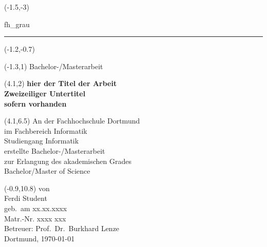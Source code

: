 \documentclass[12pt,twoside]{report}   %
\begin{document}
\begin{titlepage}
  \begin{textblock}{6.5}(-1.5,-3)
    \begin{color}{fh_grau}
      \rule{6.8cm}{33cm}    
    \end{color}
  \end{textblock}
  \begin{textblock}{6.5}(-1.2,-0.7)
  \end{textblock}
  \begin{textblock}{6.5}(-1.3,1)
    {\large \textsf{Bachelor-/Masterarbeit}}            
  \end{textblock}

  \begin{textblock}{7}(4.1,2)
    {\noindent \huge 
      \textsf{\textbf{hier der Titel der Arbeit\\[0.3cm] 
          \Large  Zweizeiliger Untertitel\\[0.05cm]
          sofern vorhanden}} }
  \end{textblock}


  \begin{textblock}{6}(4.1,6.5)\noindent
    \textsf{An der Fachhochschule Dortmund\\
    im Fachbereich Informatik\\
    Studiengang Informatik \\
    erstellte Bachelor-/Masterarbeit \\
    zur Erlangung des akademischen Grades\\
    Bachelor/Master of Science}
  \end{textblock}

  \begin{textblock}{6.5}(-0.9,10.8)
    \noindent
    \textsf{von \\
      Ferdi Student \\
      geb.\ am xx.xx.xxxx  \\
      Matr.-Nr. xxxx xxx\\[0.7cm]
      Betreuer: Prof.\ Dr.\ Burkhard Lenze \\[0.5cm]
      Dortmund, \today}    
  \end{textblock}

\end{titlepage}
\end{document}
